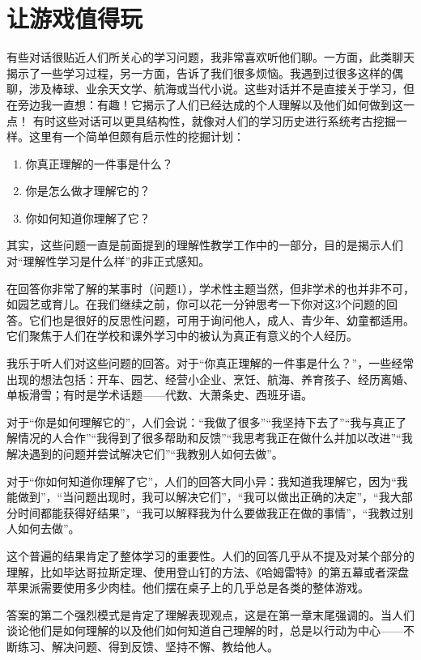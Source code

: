 \chapter{让游戏值得玩}
有些对话很贴近人们所关心的学习问题，我非常喜欢听他们聊。一方面，此类聊天揭示了一些学习过程，另一方面，告诉了我们很多烦恼。我遇到过很多这样的偶聊，涉及棒球、业余天文学、航海或当代小说。这些对话并不是直接关于学习，但在旁边我一直想：有趣！它揭示了人们已经达成的个人理解以及他们如何做到这一点！
有时这些对话可以更具结构性，就像对人们的学习历史进行系统考古挖掘一样。这里有一个简单但颇有启示性的挖掘计划：
\begin{enumerate}
    \item 你真正理解的一件事是什么？
    \item 你是怎么做才理解它的？
    \item 你如何知道你理解了它？
\end{enumerate}

其实，这些问题一直是前面提到的理解性教学工作中的一部分，目的是揭示人们对“理解性学习是什么样”的非正式感知。

在回答你非常了解的某事时（问题1），学术性主题当然，但非学术的也并非不可，如园艺或育儿。在我们继续之前，你可以花一分钟思考一下你对这3个问题的回答。它们也是很好的反思性问题，可用于询问他人，成人、青少年、幼童都适用。它们聚焦于人们在学校和课外学习中的被认为真正有意义的个人经历。

我乐于听人们对这些问题的回答。对于“你真正理解的一件事是什么？”，一些经常出现的想法包括：开车、园艺、经营小企业、烹饪、航海、养育孩子、经历离婚、单板滑雪；有时是学术话题——代数、大萧条史、西班牙语。

对于“你是如何理解它的”，人们会说：“我做了很多”“我坚持下去了”“我与真正了解情况的人合作”“我得到了很多帮助和反馈”“我思考我正在做什么并加以改进”“我解决遇到的问题并尝试解决它们”“我教别人如何去做”。

对于“你如何知道你理解了它”，人们的回答大同小异：我知道我理解它，因为“我能做到”，“当问题出现时，我可以解决它们”，“我可以做出正确的决定”，“我大部分时间都能获得好结果”，“我可以解释我为什么要做我正在做的事情”，“我教过别人如何去做”。

这个普遍的结果肯定了整体学习的重要性。人们的回答几乎从不提及对某个部分的理解，比如毕达哥拉斯定理、使用登山钉的方法、《哈姆雷特》的第五幕或者深盘苹果派需要使用多少肉桂。他们摆在桌子上的几乎总是各类的整体游戏。

答案的第二个强烈模式是肯定了理解表现观点，这是在第一章末尾强调的。当人们谈论他们是如何理解的以及他们如何知道自己理解的时，总是以行动为中心——不断练习、解决问题、得到反馈、坚持不懈、教给他人。

